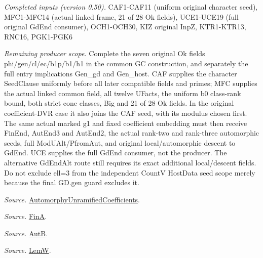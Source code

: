 \emph{Completed inputs (version 0.50).} CAF1-CAF11 (uniform original character seed), MFC1-MFC14 (actual linked frame, 21 of 28 Ok fields), UCE1-UCE19 (full original GdEnd consumer), OCH1-OCH30, KIZ original InpZ, KTR1-KTR13, RNC16, PGK1-PGK6

\emph{Remaining producer scope.} Complete the seven original Ok fields phi/gen/cl/ec/b1p/b1/h1 in the common GC construction, and separately the full entry implications Gen\_\allowbreak gd and Gen\_\allowbreak host. CAF supplies the character SeedClause uniformly before all later compatible fields and primes; MFC supplies the actual linked common field, all twelve UFacts, the uniform b0 class-rank bound, both strict cone classes, Big and 21 of 28 Ok fields. In the original coefficient-DVR case it also joins the CAF seed, with its modulus chosen first. The same actual marked g1 and fixed coefficient embedding must then receive FinEnd, AutEnd3 and AutEnd2, the actual rank-two and rank-three automorphic seeds, full ModUAlt/PfromAut, and original local/automorphic descent to GdEnd. UCE supplies the full GdEnd consumer, not the producer. The alternative GdEndAlt route still requires its exact additional local/descent fields. Do not exclude ell=3 from the independent CountV HostData seed scope merely because the final GD.gen guard excludes it.

\emph{Source.} \href{https://github.com/CocoSgt/riemann-hypothesis-lean/blob/7cbf7a0c32fca1badf05931879a37c3f8a2b03b4/src/Development/AutomorphicArithmetic/AutomorphicVarieties/AutomorphicCases/AutomorphyUnramifiedCoefficients.lean#L24-L27}{AutomorphyUnramifiedCoefficients}.

\emph{Source.} \href{https://github.com/CocoSgt/riemann-hypothesis-lean/blob/7cbf7a0c32fca1badf05931879a37c3f8a2b03b4/src/Development/AutomorphicArithmetic/AutomorphicVarieties/AutomorphicCases/AutomorphyUnramifiedCoefficients.lean#L12-L13}{FinA}.

\emph{Source.} \href{https://github.com/CocoSgt/riemann-hypothesis-lean/blob/7cbf7a0c32fca1badf05931879a37c3f8a2b03b4/src/Development/AutomorphicArithmetic/AutomorphicVarieties/AutomorphicCases/AutomorphyUnramifiedCoefficients.lean#L15-L17}{AutB}.

\emph{Source.} \href{https://github.com/CocoSgt/riemann-hypothesis-lean/blob/7cbf7a0c32fca1badf05931879a37c3f8a2b03b4/src/Development/AutomorphicArithmetic/AutomorphicVarieties/AutomorphicCases/AutomorphyUnramifiedCoefficients.lean#L19-L22}{LemW}.



